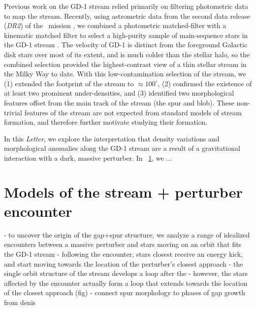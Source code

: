 \documentclass[12pt, modern]{aastex62}
\newcommand{\acronym}[1]{{\small{#1}}}
\newcommand{\articlename}{\textsl{Letter}}
\newcommand{\DRtwo}{\textsl{\acronym{DR2}}}
\begin{document}
Previous work on the GD-1 stream relied primarily on filtering photometric data to map the stream.
Recently, using astrometric data from the second data release (\DRtwo) of the \gaia\ mission \citep{TODO}, we combined a photometric matched-filter with a kinematic matched filter to select a high-purity sample of main-sequence stars in the GD-1 stream \citep{Price-Whelan:2018}.
The velocity of GD-1 is distinct from the foreground Galactic disk stars over most of its extent, and is much colder than the stellar halo, so the combined selection provided the highest-contrast view of a thin stellar stream in the Milky Way to date.
With this low-contamination selection of the stream, we (1) extended the footprint of the stream to $\approx 100^\circ$, (2) confirmed the existence of at least two prominent under-densities, and (3) identified two morphological features offset from the main track of the stream (the spur and blob).
These non-trivial features of the stream are not expected from standard models of stream formation, and therefore further motivate studying their formation.

In this \articlename, we explore the interpretation that density variations and morphological anomalies along the GD-1 stream are a result of a gravitational interaction with a dark, massive perturber.
In \sectionname~\ref{sec:model}, we ...


\section{Models of the stream + perturber encounter}
\label{sec:model}
- to uncover the origin of the gap+spur structure, we analyze a range of idealized encounters between a massive perturber and stars moving on an orbit that fits the GD-1 stream
- following the encounter, stars closest receive an energy kick, and start moving towards the location of the perturber's closest approach
- the single orbit structure of the stream develops a loop after the
- however, the stars affected by the encounter actually form a loop that extends towards the location of the closest approach (fig)
- connect spur morphology to phases of gap growth from denis
\end{document}
